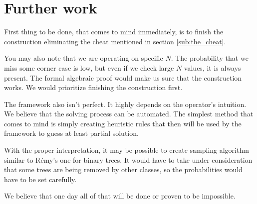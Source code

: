 \documentclass[final]{article}
\theoremstyle{definition}
\theoremstyle{remark}
\begin{document}
\section{Further work}%
\label{sec:further_work}

First thing to be done, that comes to mind immediately, is to finish the construction eliminating the cheat mentioned in section \ref{sub:the_cheat}.

You may also note that we are operating on specific \(N\). The probability that we miss some corner case is low, but even if we check large \(N\) values, it is always present. The formal algebraic proof would make us sure that the construction works. We would prioritize finishing the construction first.

The framework also isn't perfect. It highly depends on the operator's intuition. We believe that the solving process can be automated. The simplest method that comes to mind is simply creating heuristic rules that then will be used by the framework to guess at least partial solution.

With the proper interpretation, it may be possible to create sampling algorithm similar to Rémy's one for binary trees\cite{remy,note}. It would have to take under consideration that some trees are being removed by other classes, so the probabilities would have to be set carefully.

We believe that one day all of that will be done or proven to be impossible.

\clearpage
\end{document}
